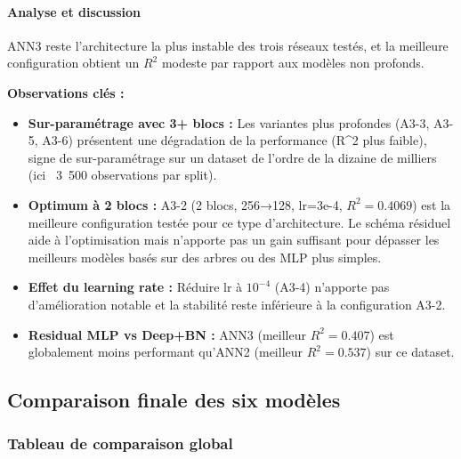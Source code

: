\documentclass[12pt,a4paper]{article}
\begin{document}
\paragraph{Analyse et discussion}

ANN3 reste l'architecture la plus instable des trois réseaux testés, et la meilleure
configuration obtient un $R^2$ modeste par rapport aux modèles non profonds.

\textbf{Observations clés :}

\begin{itemize}[leftmargin=*]
    \item \textbf{Sur-paramétrage avec 3+ blocs :} Les variantes plus profondes (A3-3, A3-5, A3-6)
    présentent une dégradation de la performance (R^2 plus faible), signe de sur-paramétrage
    sur un dataset de l'ordre de la dizaine de milliers (ici ~3~500 observations par split).

    \item \textbf{Optimum à 2 blocs :} A3-2 (2 blocs, 256→128, lr=3e-4, $R^2 = 0.4069$)
    est la meilleure configuration testée pour ce type d'architecture. Le schéma résiduel
    aide à l'optimisation mais n'apporte pas un gain suffisant pour dépasser les meilleurs
    modèles basés sur des arbres ou des MLP plus simples.

    \item \textbf{Effet du learning rate :} Réduire lr à $10^{-4}$ (A3-4) n'apporte pas
    d'amélioration notable et la stabilité reste inférieure à la configuration A3-2.

    \item \textbf{Residual MLP vs Deep+BN :} ANN3 (meilleur $R^2 = 0.407$)
    est globalement moins performant qu'ANN2 (meilleur $R^2 = 0.537$) sur ce dataset.
\end{itemize}


\subsection{Comparaison finale des six modèles}
\label{sec:comparaison_finale}

\subsubsection{Tableau de comparaison global}
\end{document}
